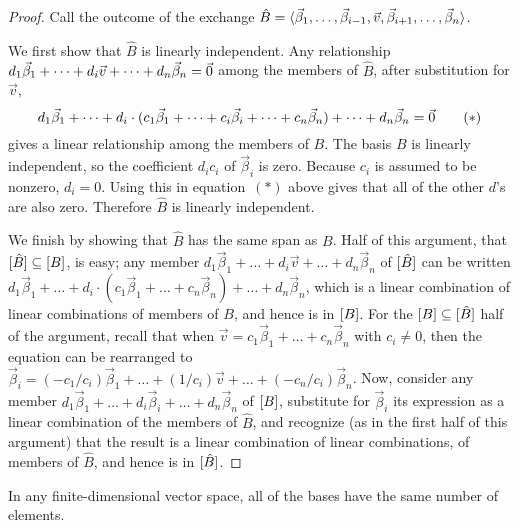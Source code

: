 \begin{proof}
Call the outcome of the exchange 
\( \hat{B}=\langle\vec{\beta}_1,\dots,\vec{\beta}_{i-1},\vec{v},
                       \vec{\beta}_{i+1},\dots,\vec{\beta}_n\rangle  \).

We first show that $\hat{B}$ is linearly independent.
Any relationship 
\( d_1\vec{\beta}_1+\dots+d_i\vec{v}+\dots+d_n\vec{\beta}_n=\vec{0} \)
among the members of $\hat{B}$, after substitution for $\vec{v}$,
\begin{equation*}
  d_1\vec{\beta}_1+\dots
    +d_i\cdot(c_1\vec{\beta}_1+\dots+c_i\vec{\beta}_i+\dots+c_n\vec{\beta}_n)
    +\dots+d_n\vec{\beta}_n
  =\vec{0}
\tag*{($*$)}\end{equation*}
gives a linear relationship among the members of $B$.
The basis $B$ is linearly independent, so the coefficient $d_ic_i$ of 
$\vec{\beta}_i$ is zero.
Because $c_i$ is assumed to be nonzero, $d_i=0$.
Using this in equation~$(*)$ above gives that all of the other $d$'s are also
zero.
Therefore $\hat{B}$ is linearly independent.

We finish by showing that $\hat{B}$ has the same span as $B$.
Half of this argument, that $\relax [\smash{\hat{B}}\relax ]\subseteq\relax [B\relax ]$, 
is easy; any member 
$d_1\vec{\beta}_1+\dots+d_i\vec{v}+\dots+d_n\vec{\beta}_n$
of $\relax [\smash{\hat{B}}\relax ]$ can be written
$
  d_1\vec{\beta}_1+\dots
    +d_i\cdot(c_1\vec{\beta}_1+\dots+c_n\vec{\beta}_n)
    +\dots+d_n\vec{\beta}_n
$,
which is a linear combination of linear combinations of members of $B$, and
hence is in $\relax [B\relax ]$.
For the $\relax [B\relax ]\subseteq\relax [\smash{\hat{B}}\relax ]$ half of the argument,
recall that when
$\vec{v}=c_1\vec{\beta}_1+\dots+c_n\vec{\beta}_n$ with $c_i\neq 0$,
then the equation can be rearranged to
$\vec{\beta}_i=(-c_1/c_i)\vec{\beta}_1+\dots+(1/c_i)\vec{v}+\dots
   +(-c_n/c_i)\vec{\beta}_n$.
Now, consider any member
$d_1\vec{\beta}_1+\dots+d_i\vec{\beta}_i+\dots+d_n\vec{\beta}_n$
of $\relax [B\relax ]$, substitute for $\vec{\beta}_i$ its expression as a linear
combination of the members of $\hat{B}$, and recognize 
(as in the first half of this argument) that the result is a linear
combination of linear combinations, of members of $\hat{B}$, and hence is in 
$\relax [\smash{\hat{B}}\relax ]$.
\end{proof}

\begin{theorem}
\label{th:AllBasesSameSize}
In any finite-dimensional vector space, all of the 
bases have the same number of elements.
\end{theorem}

